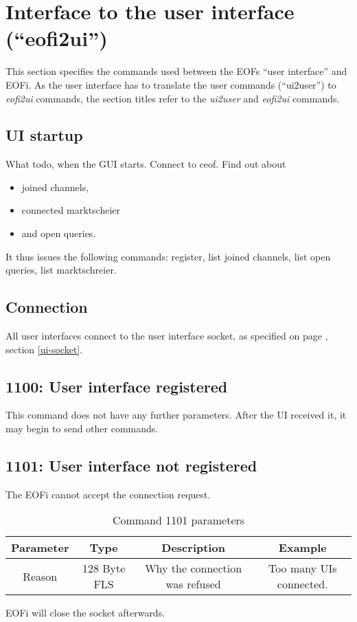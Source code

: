 \documentclass[12pt,a4paper]{book}
\begin{document}
\section{Interface to the user interface ("`eofi2ui"')}
This section specifies the commands used between the EOFs
"`user interface"' and EOFi. As the user interface has to translate
the user commands ("`ui2user"') to \emph{eofi2ui} commands, the
section titles refer to the \emph{ui2user} and \emph{eofi2ui} commands.
\subsection{UI startup}
What todo, when the GUI starts.
Connect to ceof. Find out about
\begin{itemize}
\item joined channels,
\item connected marktscheier
\item and open queries.
\end{itemize}
It thus issues the following commands:
register, list joined channels, list open queries, list marktschreier.
\subsection{Connection}
All user interfaces connect to the user interface socket, as specified
on page \pageref{ui-socket}, section \ref{ui-socket}.
\subsection{1100: User interface registered}
This command does not have any further parameters.
After the UI received it, it may begin to send other commands.
\subsection{1101: User interface not registered}
The EOFi cannot accept the connection request.
\begin{longtable}{|c|c|c|c|}
\caption{Command 1101 parameters}\\
\hline
\textbf{Parameter} & \textbf{Type} & \textbf{Description} & \textbf{Example}\\
\hline
Reason & 128 Byte FLS & Why the connection was refused & Too many UIs connected.\\
\hline
\end{longtable}
EOFi will close the socket afterwards.
\end{document}
